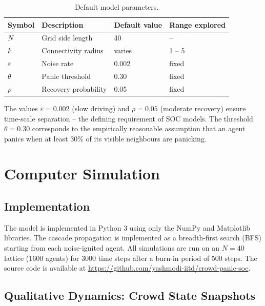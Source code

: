 \documentclass[12pt, a4paper]{article}
\begin{document}
\begin{table}[h]
  \centering
  \caption{Default model parameters.}
  \label{tab:params}
  \begin{tabular}{llll}
    \toprule
    Symbol & Description & Default value & Range explored \\
    \midrule
    $N$        & Grid side length       & 40      & --       \\
    $k$        & Connectivity radius    & varies  & 1 -- 5   \\
    $\varepsilon$ & Noise rate          & 0.002   & fixed    \\
    $\theta$   & Panic threshold        & 0.30    & fixed    \\
    $\rho$     & Recovery probability   & 0.05    & fixed    \\
    \bottomrule
  \end{tabular}
\end{table}

The values $\varepsilon = 0.002$ (slow driving) and $\rho = 0.05$ (moderate
recovery) ensure time-scale separation -- the defining requirement of SOC models.
The threshold $\theta = 0.30$ corresponds to the empirically reasonable assumption
that an agent panics when at least 30\% of its visible neighbours are panicking.

\section{Computer Simulation}
\label{sec:simulation}

\subsection{Implementation}

The model is implemented in Python 3 using only the NumPy and Matplotlib
libraries.  The cascade propagation is implemented as a breadth-first search
(BFS) starting from each noise-ignited agent.  All simulations are run on an
$N=40$ lattice ($1600$ agents) for 3000 time steps after a burn-in period of 500
steps.  The source code is available at \url{https://github.com/yashmodi-iitd/crowd-panic-soc}.

\subsection{Qualitative Dynamics: Crowd State Snapshots}
\end{document}
